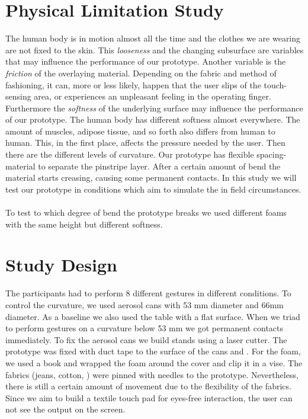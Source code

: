 \section{Physical Limitation Study}
The human body is in motion almost all the time and the clothes we are wearing are not fixed to the skin. This \emph{looseness} and the changing subsurface are variables that may influence the performance of our prototype. Another variable is the \emph{friction} of the overlaying material. Depending on the fabric and method of fashioning, it can, more or less likely, happen that the user slips of the touch-sensing area, or experiences an unpleasant feeling in the operating finger. Furthermore the \emph{softness} of the underlying surface may influence the performance of our prototype. The human body has different softness almost everywhere. The amount of muscles, adipose tissue, and so forth also differs from human to human. This, in the first place, affects the pressure needed by the user. Then there are the different levels of curvature. Our prototype has flexible spacing-material to separate the pinstripe layer. After a certain amount of bend the material starts creasing, causing some permanent contacts. In this study we will test our prototype in conditions which aim to simulate the in field circumstances.\\ \\

To test to which degree of bend the prototype breaks we used different foams with the same height but different softness.

\section{Study Design}
The participants had to perform 8 different gestures in different conditions. To control the curvature, we used aerosol cans with 53 mm diameter and 66mm diameter. As a baseline we also used the table with a flat surface. When we triad to perform gestures on a curvature below 53 mm we got permanent contacts immediately. To fix the aerosol cans we build stands using a laser cutter. The prototype was fixed with duct tape to the surface of the cans and . For the foam, we used a book and wrapped the foam around the cover and clip it in a vise. The fabrics (jeans, cotton,  ) were pinned with needles to the prototype. Nevertheless, there is still a certain amount of movement due to the flexibility of the fabrics. Since we aim to build a textile touch pad for eyes-free interaction, the user can not see the output on the screen. 

